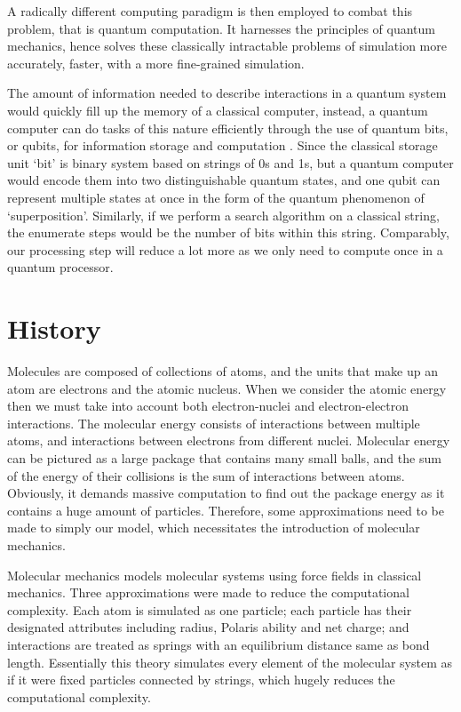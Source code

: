 \documentclass[12pt]{article}
\begin{document}
A radically different computing paradigm is then employed to combat this problem, that is quantum computation. It harnesses the principles of quantum
mechanics, hence solves these classically intractable problems of simulation more accurately, faster, with a more fine-grained simulation.

The amount of information needed to describe interactions in a quantum system would quickly fill up the memory of a classical computer, instead,
a quantum computer can do tasks of this nature efficiently through the use of quantum bits, or qubits, for information storage and computation
\cite{trabesinger2012quantum}. Since the classical storage unit ‘bit’ is binary system based on strings of 0s and 1s, but a quantum computer would
encode them into two distinguishable quantum states, and one qubit can represent multiple states at once in the form of the quantum phenomenon of
‘superposition’. Similarly, if we perform a search algorithm on a classical string, the enumerate steps would be the number of bits within this
string. Comparably, our processing step will reduce a lot more as we only need to compute once in a quantum processor.

\section{History}
Molecules are composed of collections of atoms, and the units that make up an atom are electrons and the atomic nucleus. When we consider the
 atomic energy then we must take into account both electron-nuclei and electron-electron interactions. The molecular energy consists of interactions
 between multiple atoms, and interactions between electrons from different nuclei. Molecular energy can be pictured as a large
 package that contains many small balls, and the sum of the energy of their collisions is the sum of interactions between atoms. Obviously, it
 demands massive computation to find out the package energy as it contains a huge amount of particles. Therefore, some approximations need to be
  made to simply our model, which necessitates the introduction of molecular mechanics.

Molecular mechanics models molecular systems using force fields in classical mechanics. Three approximations were made to reduce the computational
 complexity. Each atom is simulated as one particle; each particle has their designated attributes including radius, Polaris ability and net charge;
 and interactions are treated as springs with an equilibrium distance same as bond length. Essentially this theory simulates every element of the
 molecular system as if it were fixed particles connected by strings, which hugely reduces the computational complexity.
\end{document}
